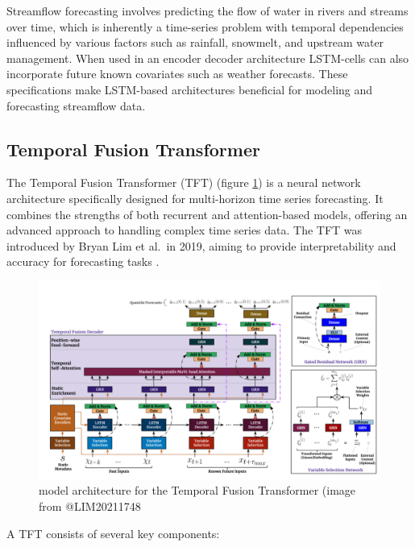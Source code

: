 \documentclass[
]{krantz}
\begin{document}
Streamflow forecasting involves predicting the flow of water in rivers and streams over time, which is inherently a time-series problem with temporal dependencies influenced by various factors such as rainfall, snowmelt, and upstream water management. When used in an encoder decoder architecture LSTM-cells can also incorporate future known covariates such as weather forecasts. These specifications make LSTM-based architectures beneficial for modeling and forecasting streamflow data.

\subsection{Temporal Fusion Transformer}\label{temporal-fusion-transformer}

The Temporal Fusion Transformer (TFT) (figure \ref{fig:tft}) is a neural network architecture specifically designed for multi-horizon time series forecasting. It combines the strengths of both recurrent and attention-based models, offering an advanced approach to handling complex time series data. The TFT was introduced by Bryan Lim et al.~in 2019, aiming to provide interpretability and accuracy for forecasting tasks \citet{LIM20211748}.

\begin{figure}

{\centering \includegraphics[width=0.8\linewidth]{work/07-hydroLSTM/images/TFT} 

}

\caption{model architecture for the Temporal Fusion Transformer (image from @LIM20211748}\label{fig:tft}
\end{figure}

A TFT consists of several key components:
\end{document}
